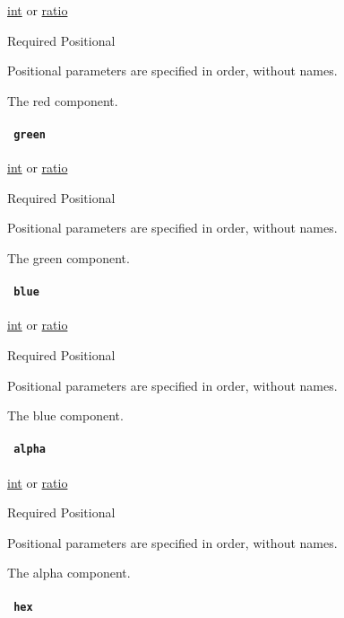 \href{/docs/reference/foundations/int/}{int} {or}
\href{/docs/reference/layout/ratio/}{ratio}

{Required} {{ Positional }}

\label{definitions-rgb-red-positional-tooltip}
Positional parameters are specified in order, without names.

The red component.

\paragraph{\texorpdfstring{\texttt{\ green\ }}{ green }}\label{definitions-rgb-green}

\href{/docs/reference/foundations/int/}{int} {or}
\href{/docs/reference/layout/ratio/}{ratio}

{Required} {{ Positional }}

\label{definitions-rgb-green-positional-tooltip}
Positional parameters are specified in order, without names.

The green component.

\paragraph{\texorpdfstring{\texttt{\ blue\ }}{ blue }}\label{definitions-rgb-blue}

\href{/docs/reference/foundations/int/}{int} {or}
\href{/docs/reference/layout/ratio/}{ratio}

{Required} {{ Positional }}

\label{definitions-rgb-blue-positional-tooltip}
Positional parameters are specified in order, without names.

The blue component.

\paragraph{\texorpdfstring{\texttt{\ alpha\ }}{ alpha }}\label{definitions-rgb-alpha}

\href{/docs/reference/foundations/int/}{int} {or}
\href{/docs/reference/layout/ratio/}{ratio}

{Required} {{ Positional }}

\label{definitions-rgb-alpha-positional-tooltip}
Positional parameters are specified in order, without names.

The alpha component.

\paragraph{\texorpdfstring{\texttt{\ hex\ }}{ hex }}\label{definitions-rgb-hex}

